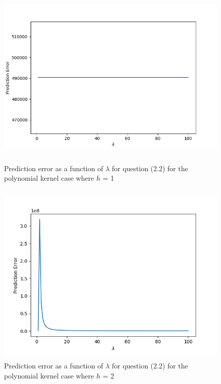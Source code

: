 \begin{figure}[h!]
    \centering
    \includegraphics[height=3.5in]{Figure_6.png}
    \caption{Prediction error as a function of $\lambda$ for question (2.2) for the polynomial kernel case where $h$ = 1}
\end{figure}
\begin{figure}[h!]
    \centering
    \includegraphics[height=3.5in]{Figure_7.png}
    \caption{Prediction error as a function of $\lambda$ for question (2.2) for the polynomial kernel case where $h$ = 2}
\end{figure}
